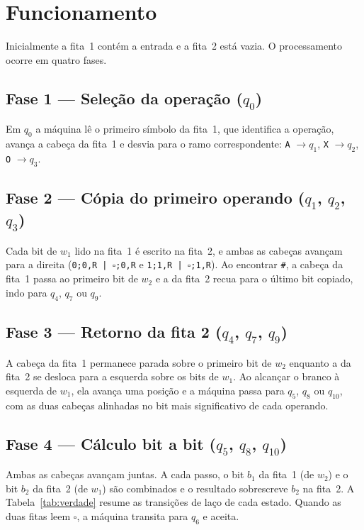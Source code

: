 \documentclass[report, 12pt]{uftreport}
\begin{document}
\section{Funcionamento}

Inicialmente a fita~1 contém a entrada e a fita~2 está vazia. O
processamento ocorre em quatro fases.

\subsection{Fase 1 --- Seleção da operação ($q_0$)}

Em $q_0$ a máquina lê o primeiro símbolo da fita~1, que identifica a
operação, avança a cabeça da fita~1 e desvia para o ramo correspondente:
\texttt{A} $\to q_1$, \texttt{X} $\to q_2$, \texttt{O} $\to q_3$.

\subsection{Fase 2 --- Cópia do primeiro operando ($q_1$, $q_2$, $q_3$)}

Cada bit de $w_1$ lido na fita~1 é escrito na fita~2, e ambas as cabeças
avançam para a direita (\texttt{0;0,R | $\square$;0,R} e
\texttt{1;1,R | $\square$;1,R}). Ao encontrar \texttt{\#}, a cabeça da
fita~1 passa ao primeiro bit de $w_2$ e a da fita~2 recua para o último bit
copiado, indo para $q_4$, $q_7$ ou $q_9$.

\subsection{Fase 3 --- Retorno da fita 2 ($q_4$, $q_7$, $q_9$)}

A cabeça da fita~1 permanece parada sobre o primeiro bit de $w_2$ enquanto a
da fita~2 se desloca para a esquerda sobre os bits de $w_1$. Ao alcançar o
branco à esquerda de $w_1$, ela avança uma posição e a máquina passa para
$q_5$, $q_8$ ou $q_{10}$, com as duas cabeças alinhadas no bit mais
significativo de cada operando.

\subsection{Fase 4 --- Cálculo bit a bit ($q_5$, $q_8$, $q_{10}$)}

Ambas as cabeças avançam juntas. A cada passo, o bit $b_1$ da fita~1 (de
$w_2$) e o bit $b_2$ da fita~2 (de $w_1$) são combinados e o resultado
sobrescreve $b_2$ na fita~2. A Tabela~\ref{tab:verdade} resume as
transições de laço de cada estado. Quando as duas fitas leem $\square$, a
máquina transita para $q_6$ e aceita.
\end{document}
